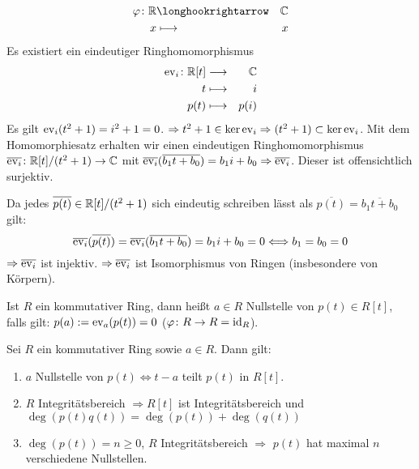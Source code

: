 \documentclass[12pt,a4paper]{scrartcl}
\begin{document}
\begin{bsp}
	\begin{eqnarray*}
		\phi\colon \IR & \longhookrightarrow & \IC\\
		x & \longmapsto & x
	\end{eqnarray*}
	Es existiert ein eindeutiger Ringhomomorphismus
	\begin{eqnarray*}
		\operatorname{ev}_i\colon \mathbb R[t] & \longrightarrow & \mathbb C\\
		t & \longmapsto & i\\
		p(t) & \longmapsto & p(i)
	\end{eqnarray*}
	Es gilt $\operatorname{ev}_i(t^2+1) = i^2 +1 = 0$. $\Rightarrow t^2+1\in\operatorname{ker} \operatorname{ev}_i\Rightarrow (t^2+1)\subset \operatorname{ker} \operatorname{ev}_i$. Mit dem Homomorphiesatz erhalten wir einen eindeutigen Ringhomomorphismus $\overline{\operatorname{ev}_i}\colon \mathbb R[t]/(t^2+1)\to \mathbb C$ mit $\overline{\operatorname{ev}_i}(\overline{b_1t+b_0}) = b_1i+b_0\Rightarrow \overline{\operatorname{ev}_i}$. Dieser ist offensichtlich surjektiv.
	
	Da jedes $\overline{p(t)}\in\mathbb R[t]/(t^2+1)$ sich eindeutig schreiben lässt als $\overline{p(t)} = \overline{b_1t+b_0}$ gilt:
	$$\overline{\operatorname{ev}_i}(\overline{p(t)}) = \overline{\operatorname{ev}_i}(\overline{b_1t+b_0}) = b_1i +b_0 = 0\Longleftrightarrow b_1 = b_0 = 0$$
	$\Rightarrow\overline{\operatorname{ev}_i}$ ist injektiv.
	$\Rightarrow \overline{\operatorname{ev}_i}$ ist Isomorphismus von Ringen (insbesondere von Körpern).
\end{bsp}

\begin{defi}
	Ist $R$ ein kommutativer Ring, dann heißt $a\in R$ Nullstelle von $p(t) \in R[t]$, falls gilt: $p(a) := \operatorname{ev}_a(p(t)) = 0$ ($\varphi\colon R\to R = \operatorname{id}_R$).
\end{defi}


\begin{satz}\label{thm:7.14}
	Sei $R$ ein kommutativer Ring sowie $a\in R$. Dann gilt:
	\begin{enumerate}
		\item $a$ Nullstelle von $p(t) \Leftrightarrow t-a$ teilt $p(t)$ in $R[t]$.
		\item $R$ Integritätsbereich $\Rightarrow R[t]$ ist Integritätsbereich und $\deg(p(t)q(t)) = \deg (p(t)) + \deg (q(t))$
		\item $\deg (p(t)) = n\geq 0$, $R$ Integritätsbereich $\Rightarrow$ $p(t)$ hat maximal $n$ verschiedene Nullstellen.
	\end{enumerate}
\end{satz}


\end{document}
